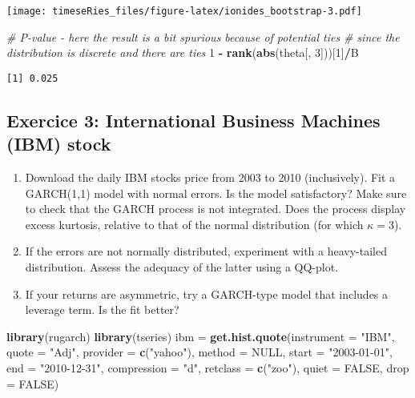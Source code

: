 \documentclass[]{book}
\newenvironment{Shaded}{\begin{snugshade}}{\end{snugshade}}
\newcommand{\KeywordTok}[1]{\textcolor[rgb]{0.13,0.29,0.53}{\textbf{#1}}}
\newcommand{\DataTypeTok}[1]{\textcolor[rgb]{0.13,0.29,0.53}{#1}}
\newcommand{\DecValTok}[1]{\textcolor[rgb]{0.00,0.00,0.81}{#1}}
\newcommand{\StringTok}[1]{\textcolor[rgb]{0.31,0.60,0.02}{#1}}
\newcommand{\CommentTok}[1]{\textcolor[rgb]{0.56,0.35,0.01}{\textit{#1}}}
\newcommand{\OtherTok}[1]{\textcolor[rgb]{0.56,0.35,0.01}{#1}}
\newcommand{\OperatorTok}[1]{\textcolor[rgb]{0.81,0.36,0.00}{\textbf{#1}}}
\newcommand{\NormalTok}[1]{#1}
\providecommand{\tightlist}{%
  \setlength{\itemsep}{0pt}\setlength{\parskip}{0pt}}
\begin{document}
\texttt{[image: timeseRies\_files/figure-latex/ionides\_bootstrap-3.pdf]}

\begin{Shaded}
\begin{Highlighting}[]
\CommentTok{# P-value - here the result is a bit spurious because of potential ties}
\CommentTok{# since the distribution is discrete and there are ties}
\DecValTok{1} \OperatorTok{-}\StringTok{ }\KeywordTok{rank}\NormalTok{(}\KeywordTok{abs}\NormalTok{(theta[, }\DecValTok{3}\NormalTok{]))[}\DecValTok{1}\NormalTok{]}\OperatorTok{/}\NormalTok{B}
\end{Highlighting}
\end{Shaded}

\begin{verbatim}
[1] 0.025
\end{verbatim}

\subsection{Exercice 3: International Business Machines (IBM)
stock}\label{exercice-3-international-business-machines-ibm-stock-1}

\begin{enumerate}
\def\labelenumi{\arabic{enumi}.}
\tightlist
\item
  Download the daily IBM stocks price from 2003 to 2010 (inclusively).
  Fit a GARCH(1,1) model with normal errors. Is the model satisfactory?
  Make sure to check that the GARCH process is not integrated. Does the
  process display excess kurtosis, relative to that of the normal
  distribution (for which \(\kappa=3\)).
\item
  If the errors are not normally distributed, experiment with a
  heavy-tailed distribution. Assess the adequacy of the latter using a
  QQ-plot.
\item
  If your returns are asymmetric, try a GARCH-type model that includes a
  leverage term. Is the fit better?
\end{enumerate}

\begin{Shaded}
\begin{Highlighting}[]
\KeywordTok{library}\NormalTok{(rugarch)}
\KeywordTok{library}\NormalTok{(tseries)}
\NormalTok{ibm =}\StringTok{ }\KeywordTok{get.hist.quote}\NormalTok{(}\DataTypeTok{instrument =} \StringTok{"IBM"}\NormalTok{, }\DataTypeTok{quote =} \StringTok{"Adj"}\NormalTok{, }\DataTypeTok{provider =} \KeywordTok{c}\NormalTok{(}\StringTok{"yahoo"}\NormalTok{), }
    \DataTypeTok{method =} \OtherTok{NULL}\NormalTok{, }\DataTypeTok{start =} \StringTok{"2003-01-01"}\NormalTok{, }\DataTypeTok{end =} \StringTok{"2010-12-31"}\NormalTok{, }\DataTypeTok{compression =} \StringTok{"d"}\NormalTok{, }
    \DataTypeTok{retclass =} \KeywordTok{c}\NormalTok{(}\StringTok{"zoo"}\NormalTok{), }\DataTypeTok{quiet =} \OtherTok{FALSE}\NormalTok{, }\DataTypeTok{drop =} \OtherTok{FALSE}\NormalTok{)}
\end{Highlighting}
\end{Shaded}
\end{document}
